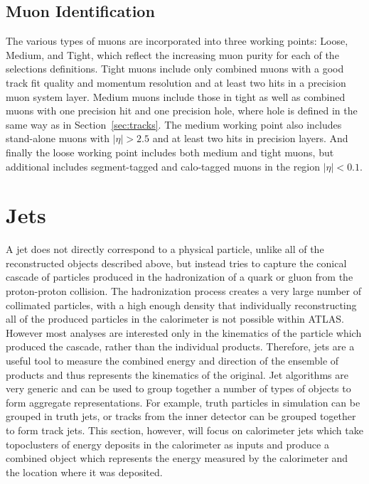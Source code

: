 \subsection{Muon Identification}

The various types of muons are incorporated into three working points: Loose, Medium, and Tight, which reflect the increasing muon purity for each of the selections definitions.
Tight muons include only combined muons with a good track fit quality and momentum resolution and at least two hits in a precision muon system layer.
Medium muons include those in tight as well as combined muons with one precision hit and one precision hole, where hole is defined in the same way as in Section~\ref{sec:tracks}.
The medium working point also includes stand-alone muons with $|\eta| > 2.5$ and at least two hits in precision layers.
And finally the loose working point includes both medium and tight muons, but additional includes segment-tagged and calo-tagged muons in the region $|\eta| < 0.1$.


\section{Jets}
\label{sec:jets}

A jet does not directly correspond to a physical particle, unlike all of the reconstructed objects described above, but instead tries to capture the conical cascade of particles produced in the hadronization of a quark or gluon from the proton-proton collision.
The hadronization process creates a very large number of collimated particles, with a high enough density that individually reconstructing all of the produced particles in the calorimeter is not possible within \ac{ATLAS}.
However most analyses are interested only in the kinematics of the particle which produced the cascade, rather than the individual products.
Therefore, jets are a useful tool to measure the combined energy and direction of the ensemble of products and thus represents the kinematics of the original.
Jet algorithms are very generic and can be used to group together a number of types of objects to form aggregate representations.
For example, truth particles in simulation can be grouped in truth jets, or tracks from the inner detector can be grouped together to form track jets. 
This section, however, will focus on calorimeter jets which take topoclusters of energy deposits in the calorimeter as inputs and produce a combined object which represents the energy measured by the calorimeter and the location where it was deposited.

